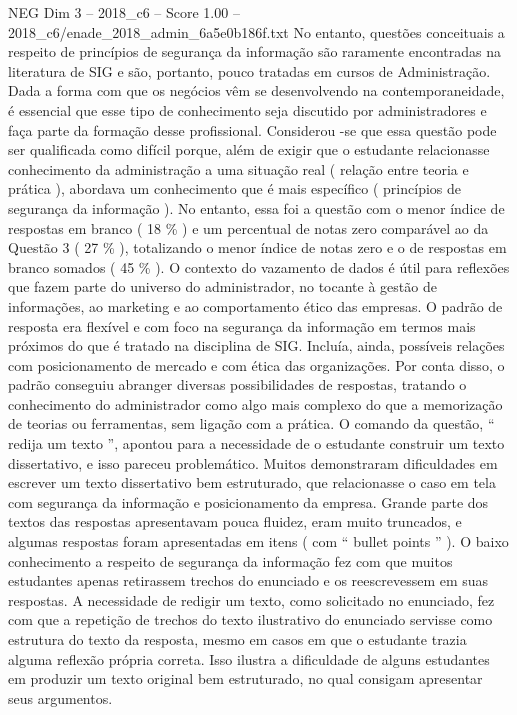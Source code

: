 \begin{textsample}{NEG Dim 3 – 2018\_c6 – Score 1.00 – 2018\_c6/enade\_2018\_admin\_6a5e0b186f.txt}
No entanto, questões conceituais a respeito de princípios de segurança da informação são raramente encontradas na literatura de SIG e são, portanto, pouco tratadas em cursos de Administração.
Dada a forma com que os negócios vêm se desenvolvendo na contemporaneidade, é essencial que esse tipo de conhecimento seja discutido por administradores e faça parte da formação desse profissional.
Considerou -se que essa questão pode ser qualificada como difícil porque, além de exigir que o estudante relacionasse conhecimento da administração a uma situação real ( relação entre teoria e prática ), abordava um conhecimento que é mais específico ( princípios de segurança da informação ).
No entanto, essa foi a questão com o menor índice de respostas em branco ( 18 \% ) e um percentual de notas zero comparável ao da Questão 3 ( 27 \% ), totalizando o menor índice de notas zero e o de respostas em branco somados ( 45 \% ).
O contexto do vazamento de dados é útil para reflexões que fazem parte do universo do administrador, no tocante à gestão de informações, ao marketing e ao comportamento ético das empresas.
O padrão de resposta era flexível e com foco na segurança da informação em termos mais próximos do que é tratado na disciplina de SIG.
Incluía, ainda, possíveis relações com posicionamento de mercado e com ética das organizações.
Por conta disso, o padrão conseguiu abranger diversas possibilidades de respostas, tratando o conhecimento do administrador como algo mais complexo do que a memorização de teorias ou ferramentas, sem ligação com a prática.
O comando da questão, “ redija um texto ”, apontou para a necessidade de o estudante construir um texto dissertativo, e isso pareceu problemático.
Muitos demonstraram dificuldades em escrever um texto dissertativo bem estruturado, que relacionasse o caso em tela com segurança da informação e posicionamento da empresa.
Grande parte dos textos das respostas apresentavam pouca fluidez, eram muito truncados, e algumas respostas foram apresentadas em itens ( com “ bullet points ” ).
O baixo conhecimento a respeito de segurança da informação fez com que muitos estudantes apenas retirassem trechos do enunciado e os reescrevessem em suas respostas.
A necessidade de redigir um texto, como solicitado no enunciado, fez com que a repetição de trechos do texto ilustrativo do enunciado servisse como estrutura do texto da resposta, mesmo em casos em que o estudante trazia alguma reflexão própria correta.
Isso ilustra a dificuldade de alguns estudantes em produzir um texto original bem estruturado, no qual consigam apresentar seus argumentos.

\end{textsample}
